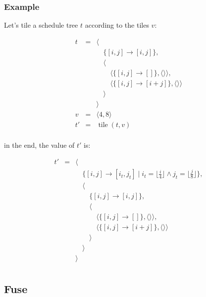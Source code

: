 \documentclass{article}
\DeclareMathOperator\tile{tile}
\begin{document}
\subsubsection*{Example}

Let's tile a schedule tree $t$ according to the tiles $v$:

\[
    \begin{array}{lcl}
        t &=& \langle \\
          & & \quad\{[i,j] \rightarrow [i,j] \},\\
          & & \quad\langle \\
          & & \quad\quad \langle\{ [i,j] \rightarrow [] \}, \langle\rangle\rangle,\\
          & & \quad\quad \langle\{ [i,j] \rightarrow [i+j] \}, \langle\rangle\rangle\\
          & & \quad\rangle \\
          & & \rangle \\
        v &=& \langle 4, 8 \rangle\\
        t'&=& \tile(t, v) \\
    \end{array}
\]

\noindent in the end, the value of $t'$ is:

\[
    \begin{array}{lcl}
        t'&=& \langle \\
          & & \quad\{[i,j] \rightarrow [i_t,j_t] \mid i_t = \lfloor\frac{i}{4}\rfloor \wedge j_t = \lfloor \frac{j}{8} \rfloor\},\\
          & & \quad\langle \\
          & & \quad\quad\{ [i,j] \rightarrow [i,j] \},\\
          & & \quad\quad\langle \\
          & & \quad\quad\quad \langle\{ [i,j] \rightarrow [] \}, \langle\rangle\rangle,\\
          & & \quad\quad\quad  \langle\{ [i,j] \rightarrow [i+j] \}, \langle\rangle\rangle\\
          & & \quad\quad\rangle \\
          & & \quad\rangle \\
          & & \rangle \\
    \end{array}
\]

\subsection{Fuse}
\end{document}
